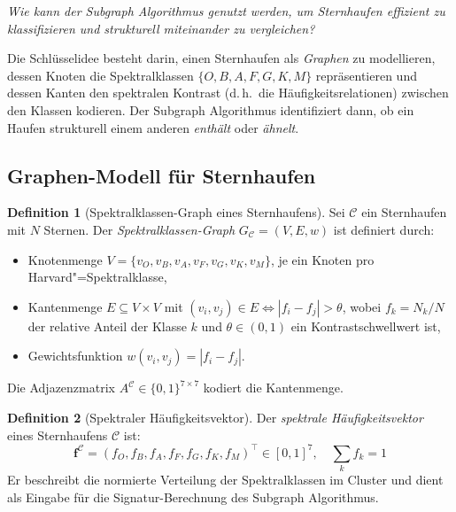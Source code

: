 ﻿\documentclass[a4paper,12pt]{article}
\theoremstyle{definition}
\newtheorem{definition}{Definition}
\begin{document}
\begin{center}
    \emph{Wie kann der Subgraph Algorithmus genutzt werden, um Sternhaufen
    effizient zu klassifizieren und strukturell miteinander zu vergleichen?}
\end{center}

Die Schlüsselidee besteht darin, einen Sternhaufen als \emph{Graphen} zu
modellieren, dessen Knoten die Spektralklassen $\{O, B, A, F, G, K, M\}$
repräsentieren und dessen Kanten den spektralen Kontrast (d.\,h.\ die
Häufigkeitsrelationen) zwischen den Klassen kodieren. Der Subgraph Algorithmus
identifiziert dann, ob ein Haufen strukturell einem anderen \emph{enthält}
oder \emph{ähnelt}.

\subsection{Graphen-Modell für Sternhaufen}

\begin{definition}[Spektralklassen-Graph eines Sternhaufens]
\label{def:clustergraph}
    Sei $\mathcal{C}$ ein Sternhaufen mit $N$ Sternen. Der
    \emph{Spektralklassen-Graph} $G_{\mathcal{C}} = (V, E, w)$ ist definiert durch:
    \begin{itemize}
        \item Knotenmenge $V = \{v_O, v_B, v_A, v_F, v_G, v_K, v_M\}$,
              je ein Knoten pro Harvard"=Spektralklasse,
        \item Kantenmenge $E \subseteq V \times V$ mit
              $(v_i, v_j) \in E \Leftrightarrow |f_i - f_j| > \theta$,
              wobei $f_k = N_k / N$ der relative Anteil der Klasse $k$ und
              $\theta \in (0,1)$ ein Kontrastschwellwert ist,
        \item Gewichtsfunktion $w(v_i, v_j) = |f_i - f_j|$.
    \end{itemize}
    Die Adjazenzmatrix $A^{\mathcal{C}} \in \{0,1\}^{7\times7}$ kodiert die Kantenmenge.
\end{definition}

\begin{definition}[Spektraler Häufigkeitsvektor]
\label{def:sigvek}
    Der \emph{spektrale Häufigkeitsvektor} eines Sternhaufens $\mathcal{C}$ ist:
    \[
        \mathbf{f}^{\mathcal{C}} = (f_O, f_B, f_A, f_F, f_G, f_K, f_M)^\top
        \in [0,1]^7, \quad \sum_{k} f_k = 1
    \]
    Er beschreibt die normierte Verteilung der Spektralklassen im Cluster und
    dient als Eingabe für die Signatur-Berechnung des Subgraph Algorithmus.
\end{definition}
\end{document}
